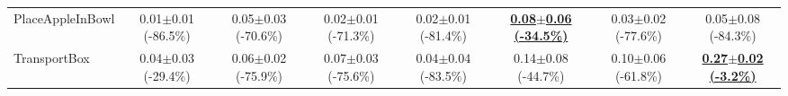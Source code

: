 \begin{table}[htbp]
\begin{adjustbox}{max width=\textwidth}
\begin{tabular}{l*{7}{c}}
PlaceAppleInBowl & 0.01$\pm$0.01 \scriptsize{(-86.5\%)} & 0.05$\pm$0.03 \scriptsize{(-70.6\%)} & 0.02$\pm$0.01 \scriptsize{(-71.3\%)} & 0.02$\pm$0.01 \scriptsize{(-81.4\%)} & \textbf{\underline{0.08$\pm$0.06 \scriptsize{(-34.5\%)}}} & 0.03$\pm$0.02 \scriptsize{(-77.6\%)} & 0.05$\pm$0.08 \scriptsize{(-84.3\%)} \\
TransportBox & 0.04$\pm$0.03 \scriptsize{(-29.4\%)} & 0.06$\pm$0.02 \scriptsize{(-75.9\%)} & 0.07$\pm$0.03 \scriptsize{(-75.6\%)} & 0.04$\pm$0.04 \scriptsize{(-83.5\%)} & 0.14$\pm$0.08 \scriptsize{(-44.7\%)} & 0.10$\pm$0.06 \scriptsize{(-61.8\%)} & \textbf{\underline{0.27$\pm$0.02 \scriptsize{(-3.2\%)}}} \\
\bottomrule
\end{tabular}
\end{adjustbox}
\end{table}

